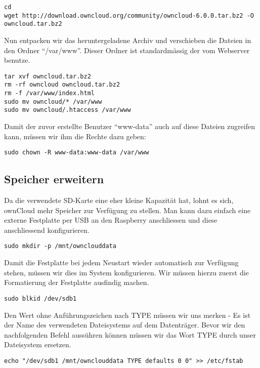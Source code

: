 \begin{lstlisting}
cd
wget http://download.owncloud.org/community/owncloud-6.0.0.tar.bz2 -O owncloud.tar.bz2
\end{lstlisting}

Nun entpacken wir das heruntergeladene Archiv und verschieben die Dateien in den Ordner ``/var/www''. Dieser Ordner ist standardmässig der vom Webserver benutze.

\begin{lstlisting}
tar xvf owncloud.tar.bz2
rm -rf owncloud owncloud.tar.bz2
rm -f /var/www/index.html
sudo mv owncloud/* /var/www
sudo mv owncloud/.htaccess /var/www
\end{lstlisting}

Damit der zuvor erstellte Benutzer ``www-data'' auch auf diese Dateien zugreifen kann, müssen wir ihm die Rechte dazu geben:

\begin{lstlisting}
sudo chown -R www-data:www-data /var/www
\end{lstlisting}

\subsection{Speicher erweitern}
Da die verwendete SD-Karte eine eher kleine Kapazität hat, lohnt es sich, ownCloud mehr Speicher zur Verfügung zu stellen. Man kann dazu einfach eine externe Festplatte per USB an den Raspberry anschliessen
und diese anschliessend konfigurieren. \\
\begin{lstlisting}
sudo mkdir -p /mnt/ownclouddata
\end{lstlisting}
Damit die Festplatte bei jedem Neustart wieder automatisch zur Verfügung stehen, müssen wir dies im System konfigurieren. Wir müssen hierzu zuerst die Formatierung der Festplatte ausfindig machen.

\begin{lstlisting}
sudo blkid /dev/sdb1
\end{lstlisting}

Den Wert ohne Anführungszeichen nach TYPE müssen wir uns merken - Es ist der Name des verwendeten Dateisystems auf dem Datenträger.
Bevor wir den nachfolgenden Befehl aussühren können müssen wir das Wort TYPE durch unser Dateisystem ersetzen.

\begin{lstlisting}
echo "/dev/sdb1 /mnt/ownclouddata TYPE defaults 0 0" >> /etc/fstab
\end{lstlisting}

